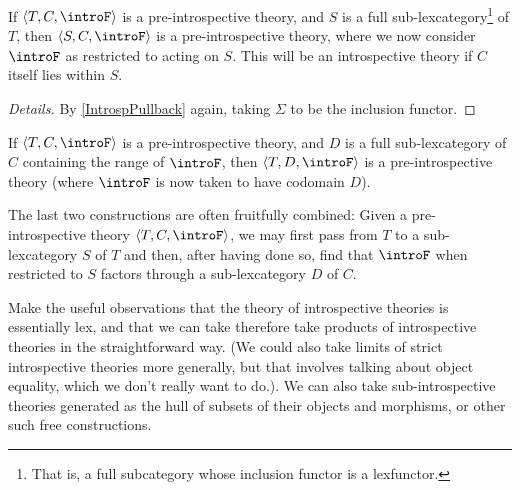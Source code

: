 \begin{construction}\label{SubPreIntrosp}
If $\langle T, C, \introF \rangle$ is a pre-introspective theory, and $S$ is a full sub-lexcategory\footnote{That is, a full subcategory whose inclusion functor is a lexfunctor.} of $T$, then $\langle S, C, \introF \rangle$ is a pre-introspective theory, where we now consider $\introF$ as restricted to acting on $S$. This will be an introspective theory if $C$ itself lies within $S$.
\end{construction}
\begin{proof}[Details]
By \cref{IntrospPullback} again, taking $\Sigma$ to be the inclusion functor.
\end{proof}

\begin{construction}\label{SubCPreIntrosp}
If $\langle T, C, \introF \rangle$ is a pre-introspective theory, and $D$ is a full sub-lexcategory of $C$ containing the range of $\introF$, then $\langle T, D, \introF \rangle$ is a pre-introspective theory (where $\introF$ is now taken to have codomain $D$).
\end{construction}

The last two constructions are often fruitfully combined: Given a pre-introspective theory $\langle T, C, \introF \rangle$, we may first pass from $T$ to a sub-lexcategory $S$ of $T$ and then, after having done so, find that $\introF$ when restricted to $S$ factors through a sub-lexcategory $D$ of $C$.

\begin{TODOblock}
Make the useful observations that the theory of introspective theories is essentially lex, and that we can take therefore take products of introspective theories in the straightforward way. (We could also take limits of strict introspective theories more generally, but that involves talking about object equality, which we don't really want to do.). We can also take sub-introspective theories generated as the hull of subsets of their objects and morphisms, or other such free constructions.
\end{TODOblock}

